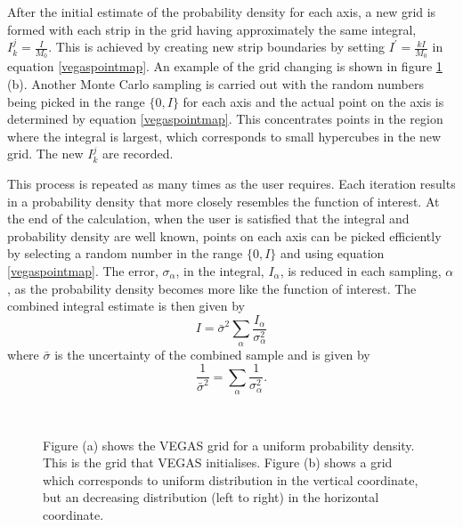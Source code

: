 After the initial estimate of the probability density for each axis, a new grid is formed with each strip in the grid having approximately the same integral, $I^j_k = \frac{I}{M_0}$. This is achieved by creating new strip boundaries by setting $I^{\prime} = \frac{kI}{M_0}$ in equation \ref{vegaspointmap}. An example of the grid changing is shown in figure \ref{vegasstrip} (b). Another  Monte Carlo sampling is carried out with the random numbers being picked in the range $\{0, I\}$ for each axis and the actual point on the axis is determined by equation \ref{vegaspointmap}. This concentrates points in the region where the integral is largest, which corresponds to small hypercubes in the new grid. The new $I^j_k$ are recorded.

This process is repeated as many times as the user requires.  Each iteration results in a probability density that more closely resembles the function of interest. At the end of the calculation, when the user is satisfied that the integral and probability density are well known, points on each axis can be picked efficiently by selecting a random number in the range $\{0, I\}$ and using equation \ref{vegaspointmap}. The error, $\sigma_{\alpha}$, in the integral, $I_{\alpha}$, is reduced in each sampling, $\alpha$, as the probability density becomes more like the function of interest. The combined integral estimate is then given by
\begin{equation}
I = \bar{\sigma}^2 \sum_{\alpha} \frac{I_{\alpha}}{\sigma_{\alpha}^2}
\end{equation}
where $\bar{\sigma}$ is the uncertainty of the combined sample and is given by
\begin{equation}
\frac{1}{\bar{\sigma}^2} = \sum_{\alpha} \frac{1}{\sigma_{\alpha}^2}.
\end{equation}

\begin{figure} 
\centering
\mbox{
}
\caption[The alteration of hypercube size by the VEGAS algorithm]{Figure (a) shows the VEGAS grid for a uniform probability density. This is the grid that VEGAS initialises. Figure (b) shows a grid which corresponds to uniform distribution in the vertical coordinate, but an decreasing distribution (left to right) in the horizontal coordinate. \label{vegasstrip}}
\end{figure}

